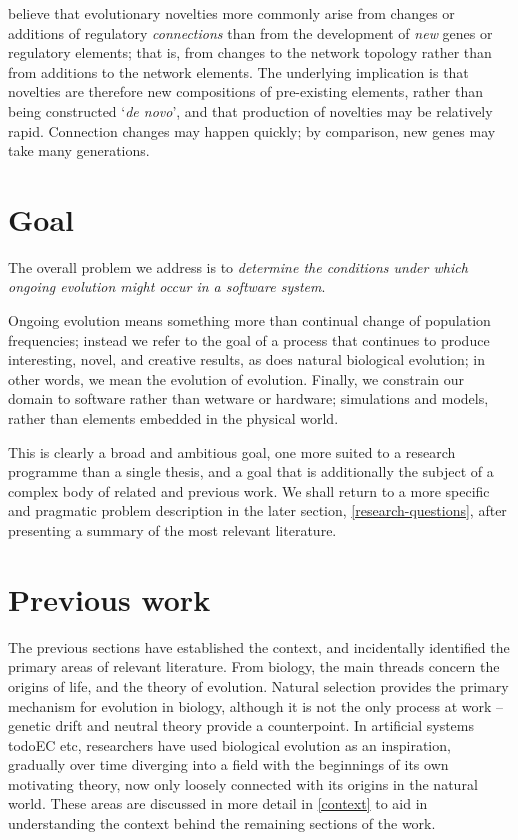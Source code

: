 \autocite{Prudhomme:2007ax} believe that evolutionary novelties more
commonly arise from changes or additions of regulatory
\emph{connections} than from the development of \emph{new} genes or
regulatory elements; that is, from changes to the network topology
rather than from additions to the network elements. The underlying
implication is that novelties are therefore new compositions of
pre-existing elements, rather than being constructed `\emph{de novo}',
and that production of novelties may be relatively rapid. Connection
changes may happen quickly; by comparison, new genes may take many generations.

\section{Goal}
The overall problem we address is to \textit{determine the conditions under which ongoing evolution might occur in a software system}. 

Ongoing evolution means something more than continual change of population frequencies; instead we refer to the goal of a process that continues to produce interesting, novel, and creative results, as does natural biological evolution; in other words, we mean the evolution of evolution. Finally, we constrain our domain to software rather than wetware or hardware; simulations and models, rather than elements embedded in the physical world.

This is clearly a broad and ambitious goal, one more suited to a research programme than a single thesis, and a goal that is additionally the subject of a complex body of related and previous work. We shall return to a more specific and pragmatic problem description in the later section, \ref{research-questions}, after presenting a summary of the most relevant literature.
	
\section{Previous work}
The previous sections have established the context, and incidentally identified the primary areas of relevant literature. From biology, the main threads concern the origins of life, and the theory of evolution. Natural selection provides the primary mechanism for evolution in biology, although it is not the only process at work -- genetic drift and neutral theory \cite{Kimura:1968uq} provide a counterpoint. In artificial systems \\todo{EC etc}, researchers have used biological evolution as an inspiration, gradually over time diverging into a field with the beginnings of its own motivating theory, now only loosely connected with its origins in the natural world. These areas are discussed in more detail in \ref{context} to aid in understanding the context behind the remaining sections of the work.

